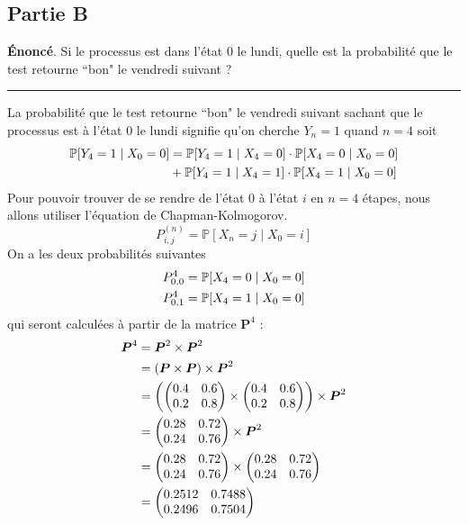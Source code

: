 \documentclass{article}
\begin{document}
\newpage
\subsection*{Partie B}
\textbf{Énoncé}. Si le processus est dans l'état 0 le lundi, quelle est
la probabilité que le test retourne ``bon" le vendredi suivant ?
\vspace{.2cm}
\hrule
\vspace{.4cm}
La probabilité que le test retourne ``bon" le vendredi suivant sachant
que le processus est à l'état 0 le lundi signifie qu'on cherche $Y_n=1$ 
quand $n=4$ soit
\begin{align}
    \mathbb{P}[Y_4=1\mid X_0=0] &= \mathbb{P}[Y_4=1\mid X_4=0]\cdot\mathbb{P}[X_4=0\mid X_0=0] \notag \\
    &+ \mathbb{P}[Y_4=1\mid X_4=1]\cdot\mathbb{P}[X_4=1\mid X_0=0]
\end{align}
Pour pouvoir trouver de se rendre de l'état 0 à l'état $i$ en $n=4$ étapes, 
nous allons utiliser l'équation de Chapman-Kolmogorov.
\[
    P^{(n)}_{i,j}=\mathbb{P}[X_n=j\mid X_0=i]
\]
On a les deux probabilités suivantes
\begin{gather}
    P^4_{0,0}=\mathbb{P}[X_4=0\mid X_0=0] \notag \\
    P^4_{0,1}=\mathbb{P}[X_4=1\mid X_0=0] \notag
\end{gather}
qui seront calculées à partir de la matrice $\boldsymbol{P}^4$ :
\begin{align}
    \boldsymbol{P}^4&=\boldsymbol{P}^2\times\boldsymbol{P}^2 \notag \\
    &= \left(\boldsymbol{P}\times\boldsymbol{P}\right)\times\boldsymbol{P}^2 \notag \\
    &= \left(\begin{pmatrix} 0.4 & 0.6 \\ 0.2 & 0.8 \end{pmatrix}\times\begin{pmatrix} 0.4 & 0.6 \\ 0.2 & 0.8 \end{pmatrix}\right)\times\boldsymbol{P}^2 \notag \\
    &= \begin{pmatrix} 0.28 & 0.72 \\ 0.24 & 0.76 \end{pmatrix}\times\boldsymbol{P}^2 \notag \\
    &= \begin{pmatrix} 0.28 & 0.72 \\ 0.24 & 0.76 \end{pmatrix}\times\begin{pmatrix} 0.28 & 0.72 \\ 0.24 & 0.76 \end{pmatrix} \notag \\
    &= \begin{pmatrix} 0.2512 & 0.7488 \\ 0.2496 & 0.7504 \end{pmatrix} \notag
\end{align}
\end{document}
